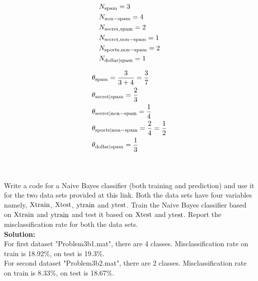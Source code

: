 \documentclass{article}
\begin{document}
\begin{equation}
\begin{aligned}
& N_{\rm spam} = 3 \\
& N_{\rm non-spam} = 4 \\
& N_{\rm secret,\rm spam} = 2 \\
& N_{\rm secret, \rm non-spam} = 1 \\
& N_{\rm sports, \rm non-spam} = 2 \\
& N_{\rm dollar | \rm spam} = 1
\end{aligned}
\end{equation}

\begin{equation}
\begin{aligned}
& \theta_{\rm spam} = \frac{3}{3+4} = \frac{3}{7} \\
&\theta_{\rm secret | \rm spam} = \frac{2}{3} \\
&\theta_{\rm secret | \rm non-spam} = \frac{1}{4} \\
&\theta_{\rm sports | \rm non-spam}=\frac{2}{4} = \frac{1}{2}\\
&\theta_{\rm dollar | \rm spam} = \frac{1}{3} 
\end{aligned}
\end{equation}
\\
\subsection{}
Write a code for a Naive Bayes classifier (both training and prediction) and use it for the two data sets provided at this link. Both the data sets have four variables namely, $\rm Xtrain$, $\rm Xtest$, $\rm ytrain$ and $\rm ytest$. Train the Naive Bayes classifier based on $\rm Xtrain$ and $\rm ytrain$ and test it based on $\rm Xtest$ and $\rm ytest$. Report the misclassification rate for both the data sets.\\
\textbf{Solution:} \\
For first dataset "Problem3b1.mat", there are 4 classes. Misclassification rate on train is 18.92\%, on test is 19.3\%.
\\
For second dataset "Problem3b2.mat", there are 2 classes. Misclassification rate on train is 8.33\%, on test is 18.67\%.

\newpage
\end{document}
